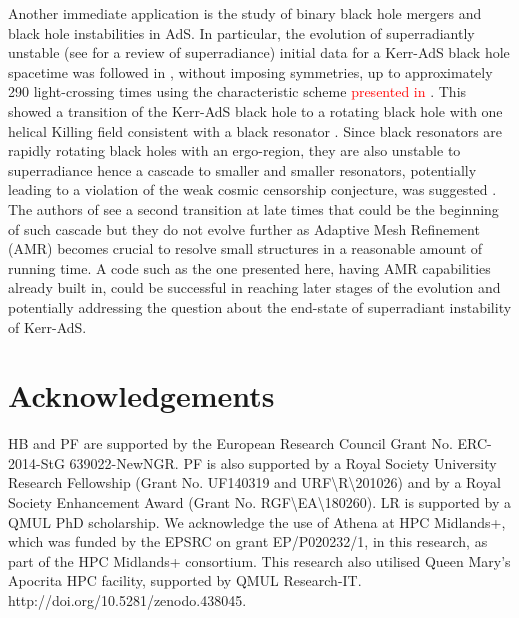 \documentclass[a4paper,11pt]{article}
\numberwithin{equation}{section}
\begin{document}
Another immediate application is the study of binary black hole mergers and black hole instabilities in AdS.
In particular, the evolution of superradiantly unstable (see \cite{Brito:2015oca} for a review of superradiance) initial data for a Kerr-AdS black hole spacetime was followed in \cite{Chesler:2018txn}, without imposing symmetries, up to approximately 290 light-crossing times using the characteristic scheme \textcolor{red}{presented in} \cite{Chesler:2013lia}. This showed a transition of the Kerr-AdS black hole to a rotating black hole with one helical Killing field consistent with a black resonator \cite{Dias:2015rxy}. Since black resonators are rapidly rotating black holes with an ergo-region, they are also unstable to superradiance \cite{Hawking:1999dp,Green:2015kur} hence a cascade to smaller and smaller resonators, potentially leading to a violation of the weak cosmic censorship conjecture, was suggested \cite{Niehoff:2015oga}. The authors of \cite{Chesler:2018txn} see a second transition at late times that could be the beginning of such cascade but they do not evolve further as Adaptive Mesh Refinement (AMR) becomes crucial to resolve small structures in a reasonable amount of running time. A code such as the one presented here, having AMR capabilities already built in, could be successful in reaching later stages of the evolution and potentially addressing the question about the end-state of superradiant instability of Kerr-AdS.



\section*{Acknowledgements}
HB and PF are supported by the European Research Council Grant No. ERC-2014-StG 639022-NewNGR. PF is also supported by a Royal Society University Research Fellowship (Grant No. UF140319 and URF\textbackslash R\textbackslash 201026) and by a Royal Society Enhancement Award (Grant No. RGF\textbackslash EA\textbackslash 180260).  LR is supported by a QMUL PhD scholarship. We acknowledge the use of Athena at HPC Midlands+, which was funded by the EPSRC on 
grant EP/P020232/1, in this research, as part of the HPC Midlands+ consortium. This research also utilised Queen Mary's Apocrita HPC facility, supported by QMUL Research-IT. http://doi.org/10.5281/zenodo.438045.
\end{document}
